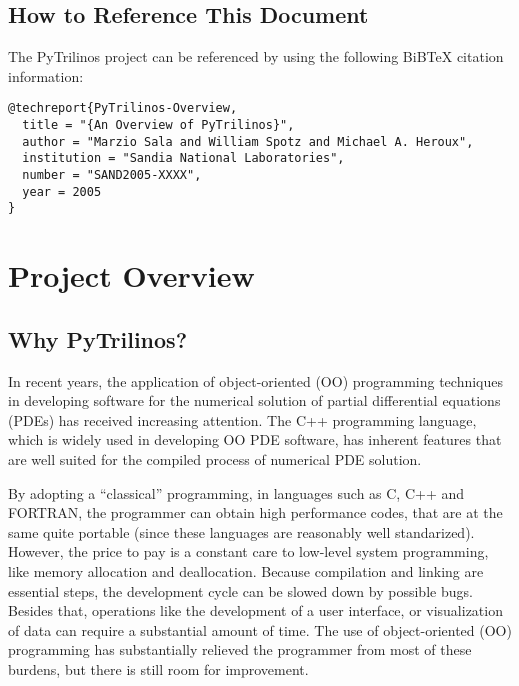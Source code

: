 \documentclass[10pt,relax]{SANDreport}
\newcommand{\PyTrilinos}{{PyTrilinos}}
\begin{document}
\subsection{How to Reference This Document}
\label{sec:reference}

The PyTrilinos project can be referenced by using the following BiBTeX
citation information: 
\begin{verbatim}
@techreport{PyTrilinos-Overview,
  title = "{An Overview of PyTrilinos}",
  author = "Marzio Sala and William Spotz and Michael A. Heroux",
  institution = "Sandia National Laboratories",
  number = "SAND2005-XXXX",
  year = 2005
}
\end{verbatim}

\section{Project Overview}
\label{sec:overview}

\subsection{Why \PyTrilinos?}
\label{sec:why}

In recent years, the application of object-oriented (OO) programming
techniques in developing software for the numerical solution of partial
differential equations (PDEs) has received increasing attention. The C++
programming language, which is widely used in developing OO PDE software, has
inherent features that are well suited for the compiled process of numerical
PDE solution.

By adopting a ``classical'' programming, in languages such as C, C++ and
FORTRAN, the programmer can  obtain high performance codes, that are at the
same quite portable (since these languages are reasonably well standarized).
However, the price to pay is a constant care to low-level system programming,
  like memory allocation and deallocation. Because compilation and linking are
  essential steps, the development cycle can be slowed down by possible bugs.
  Besides that, operations like the development of a user interface, or
  visualization of data can require a substantial amount of time. The use of
  object-oriented (OO) programming has substantially relieved the programmer
  from most of these burdens, but there is still room for improvement.
\end{document}
